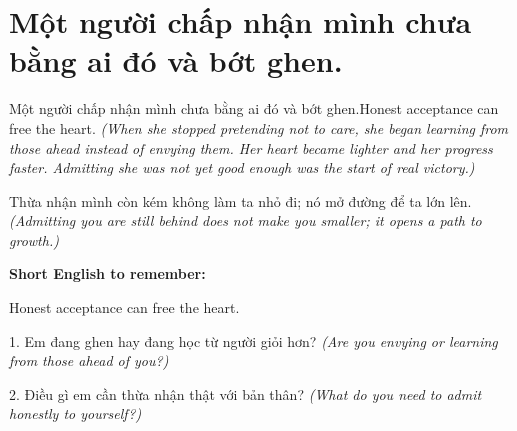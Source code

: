 \section{Một người chấp nhận mình chưa bằng ai đó và bớt ghen.}
\begin{truyen}{Một người chấp nhận mình chưa bằng ai đó và bớt ghen.}{Honest acceptance can free the heart.}
\textit{(When she stopped pretending not to care, she began learning from those ahead instead of envying them. Her heart became lighter and her progress faster. Admitting she was not yet good enough was the start of real victory.)}
\end{truyen}
\begin{baihoc}
Thừa nhận mình còn kém không làm ta nhỏ đi; nó mở đường để ta lớn lên.
\textit{(Admitting you are still behind does not make you smaller; it opens a path to growth.)}
\end{baihoc}
\begin{ghinhoanh}\textbf{Short English to remember:}

Honest acceptance can free the heart.
\end{ghinhoanh}
\begin{tuhocnhanh}
1. Em đang ghen hay đang học từ người giỏi hơn? \textit{(Are you envying or learning from those ahead of you?)}

2. Điều gì em cần thừa nhận thật với bản thân? \textit{(What do you need to admit honestly to yourself?)}
\end{tuhocnhanh}
\ngancach